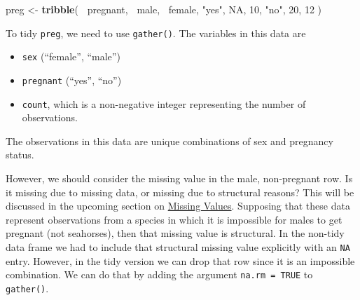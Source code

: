 \documentclass[]{book}
\newenvironment{Shaded}{\begin{snugshade}}{\end{snugshade}}
\newcommand{\CommentTok}[1]{\textcolor[rgb]{0.56,0.35,0.01}{\textit{#1}}}
\newcommand{\DataTypeTok}[1]{\textcolor[rgb]{0.13,0.29,0.53}{#1}}
\newcommand{\DecValTok}[1]{\textcolor[rgb]{0.00,0.00,0.81}{#1}}
\newcommand{\KeywordTok}[1]{\textcolor[rgb]{0.13,0.29,0.53}{\textbf{#1}}}
\newcommand{\NormalTok}[1]{#1}
\newcommand{\OperatorTok}[1]{\textcolor[rgb]{0.81,0.36,0.00}{\textbf{#1}}}
\newcommand{\OtherTok}[1]{\textcolor[rgb]{0.56,0.35,0.01}{#1}}
\newcommand{\StringTok}[1]{\textcolor[rgb]{0.31,0.60,0.02}{#1}}
\providecommand{\tightlist}{%
  \setlength{\itemsep}{0pt}\setlength{\parskip}{0pt}}
\theoremstyle{plain}
\theoremstyle{remark}
\begin{document}
\begin{Shaded}
\begin{Highlighting}[]
\NormalTok{preg <-}\StringTok{ }\KeywordTok{tribble}\NormalTok{(}
  \OperatorTok{~}\NormalTok{pregnant, }\OperatorTok{~}\NormalTok{male, }\OperatorTok{~}\NormalTok{female,}
  \StringTok{"yes"}\NormalTok{,     }\OtherTok{NA}\NormalTok{,    }\DecValTok{10}\NormalTok{,}
  \StringTok{"no"}\NormalTok{,      }\DecValTok{20}\NormalTok{,    }\DecValTok{12}
\NormalTok{)}
\end{Highlighting}
\end{Shaded}

To tidy \texttt{preg}, we need to use \texttt{gather()}. The variables in this data are

\begin{itemize}
\tightlist
\item
  \texttt{sex} (``female'', ``male'')
\item
  \texttt{pregnant} (``yes'', ``no'')
\item
  \texttt{count}, which is a non-negative integer representing the number of observations.
\end{itemize}

The observations in this data are unique combinations of sex and pregnancy status.

\begin{Shaded}
\end{Shaded}

However, we should consider the missing value in the male, non-pregnant row.
Is it missing due to missing data, or missing due to structural reasons?
This will be discussed in the upcoming section on \href{http://r4ds.had.co.nz/tidy-data.html\#missing-values-3}{Missing Values}.
Supposing that these data represent observations from a species in which it is
impossible for males to get pregnant (not seahorses), then that missing value
is structural. In the non-tidy data frame we had to include that structural missing value explicitly with an \texttt{NA} entry.
However, in the tidy version we can drop that row since it is an impossible
combination.
We can do that by adding the argument \texttt{na.rm\ =\ TRUE} to \texttt{gather()}.
\end{document}
